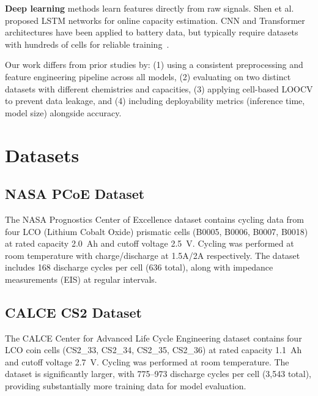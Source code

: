 \documentclass[11pt,a4paper]{article}
\begin{document}
\textbf{Deep learning} methods learn features directly from raw signals. Shen et al.~\cite{shen2019} proposed LSTM networks for online capacity estimation. CNN and Transformer architectures have been applied to battery data, but typically require datasets with hundreds of cells for reliable training~\cite{vaswani2017}.

Our work differs from prior studies by: (1) using a consistent preprocessing and feature engineering pipeline across all models, (2) evaluating on two distinct datasets with different chemistries and capacities, (3) applying cell-based LOOCV to prevent data leakage, and (4) including deployability metrics (inference time, model size) alongside accuracy.

\section{Datasets}
\label{sec:datasets}

\subsection{NASA PCoE Dataset}

The NASA Prognostics Center of Excellence dataset contains cycling data from four LCO (Lithium Cobalt Oxide) prismatic cells (B0005, B0006, B0007, B0018) at rated capacity 2.0~Ah and cutoff voltage 2.5~V. Cycling was performed at room temperature with charge/discharge at 1.5A/2A respectively. The dataset includes 168 discharge cycles per cell (636 total), along with impedance measurements (EIS) at regular intervals.

\subsection{CALCE CS2 Dataset}

The CALCE Center for Advanced Life Cycle Engineering dataset contains four LCO coin cells (CS2\_33, CS2\_34, CS2\_35, CS2\_36) at rated capacity 1.1~Ah and cutoff voltage 2.7~V. Cycling was performed at room temperature. The dataset is significantly larger, with 775--973 discharge cycles per cell (3,543 total), providing substantially more training data for model evaluation.
\end{document}
